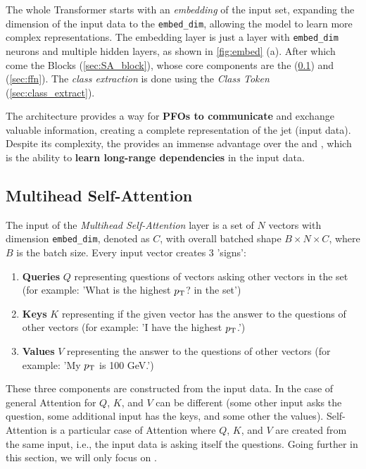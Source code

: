 The whole Transformer starts with an \emph{embedding} of the input set, expanding the dimension of the input data to the \texttt{embed\_dim}, allowing the model to learn more complex representations.
The embedding layer is just a \fc layer with \texttt{embed\_dim} neurons and multiple hidden layers, as shown in \cref{fig:embed} (a).
After which come the \SA Blocks (\cref{sec:SA_block}), whose core components are the \MHSA (\cref{sec:mhsa}) and \FFN (\cref{sec:ffn}).
The \emph{class extraction} is done using the \emph{Class Token} (\cref{sec:class_extract}).

The \trans architecture provides a way for \textbf{PFOs to communicate} and exchange valuable information, creating a complete representation of the jet (input data).
Despite its complexity, the \trans provides an immense advantage over the \PFN and \EFN, which is the ability to \textbf{learn long-range dependencies} in the input data.

\subsection{Multihead Self-Attention}
\label{sec:mhsa}
The input of the \emph{Multihead Self-Attention} layer is a set of $N$ vectors with dimension \texttt{embed\_dim}, denoted as $C$, with overall batched shape $B \times N \times C$, where $B$ is the batch size.
Every input vector creates 3 'signs':
\begin{enumerate}
    \item \textbf{Queries} $Q$ representing questions of vectors asking other vectors in the set (for example: 'What is the highest $p_\text{T}$? in the set')
    \item \textbf{Keys} $K$ representing if the given vector has the answer to the questions of other vectors (for example: 'I have the highest $p_\text{T}$.')
    \item \textbf{Values} $V$ representing the answer to the questions of other vectors (for example: 'My $p_\text{T}$ is 100 GeV.')
\end{enumerate}
These three components are constructed from the input data. 
In the case of general Attention for $Q$, $K$, and $V$ can be different (some other input asks the question, some additional input has the keys, and some other the values).
Self-Attention is a particular case of Attention where $Q$, $K$, and $V$ are created from the same input, i.e., the input data is asking itself the questions.
Going further in this section, we will only focus on \SA.


